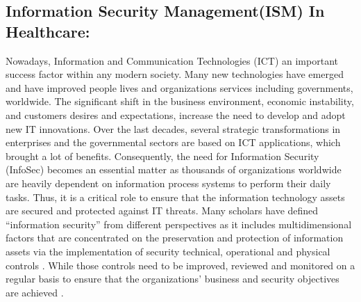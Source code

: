 
\subsection{Information Security Management(ISM) In Healthcare:}
Nowadays, Information and Communication Technologies (ICT) an important success factor within any modern society. Many new technologies have emerged and have improved people lives and organizations services including governments, worldwide. The significant shift in the business environment, economic instability, and customers desires and expectations, increase the need to develop and adopt new IT innovations. Over the last decades, several strategic transformations in enterprises and the governmental sectors are based on ICT applications, which brought a lot of benefits. Consequently, the need for Information Security (InfoSec) becomes an essential matter as thousands of organizations worldwide are heavily dependent on information process systems to perform their daily tasks. Thus, it is a critical role to ensure that the information technology assets are secured and protected against IT threats. Many scholars have defined “information security” from different perspectives as it includes multidimensional factors that are concentrated on the preservation and protection of information assets via the implementation of security technical, operational and physical controls \cite{Hamid2014,Posthumus2004}. While those controls need to be improved, reviewed and monitored on a regular basis to ensure that the organizations’ business and security objectives are achieved \cite{ISO/IEC2014}.\\

